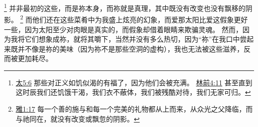 \documentclass[12pt, a4paper, oneside]{ctexart}
\begin{document}
    \footnote {
        \href{https://biblehub.com/matthew/5-6.htm}{太5:6} 那些对正义如饥似渴的有福了，因为他们会被充满。
        \href{https://biblehub.com/1_corinthians/4-11.htm}{林前4:11} 甚至直到这时辰我们还饥饿干渴，我们衣不蔽体，我们被残酷对待，我们无家可归。
	}
    并非最初的这些，而是祢本身，而祢就是真理，其中既没有改变也没有飘移的阴影。
    \footnote {
        \href{https://biblehub.com/james/1-17.htm}{雅1:17} 每一个善的施与和每一个完美的礼物都从上而来，从众光之父降临，而与祂同在，就没有改变或飘忽的阴影。
	}
    而他们还在这些菜肴中为我盛上炫亮的幻象，而爱那太阳比爱这假象更好一些，因为太阳至少对肉眼是真实的，而假象却借着眼睛来欺骗灵魂。
    然而，因为我将它们想象成祢，就将其嚼下，当然并没有多么热切，因为“祢”在我口中尝起来既并不像是祢的美味（因为祢不是那些空洞的虚构），我也无法被这些滋养，反而被更加耗尽。
\end{document}
